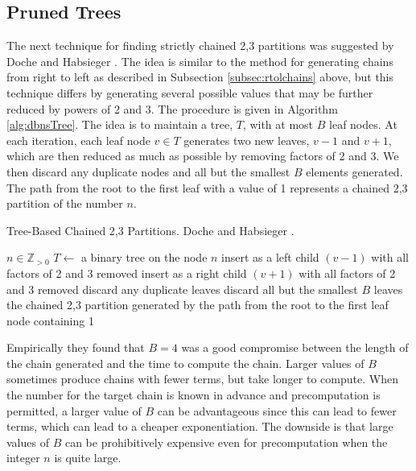 \documentclass{ucalgthes1}
\theoremstyle{plain}
\theoremstyle{definition}
\newcommand{\ZZgtz}{\mathbb{Z}_{>0}}
\begin{document}
\bigbreak
\subsection{Pruned Trees}

The next technique for finding strictly chained 2,3 partitions was suggested by Doche and Habsieger \cite{Doche2008}. The idea is similar to the method for generating chains from right to left as described in Subsection \ref{subsec:rtolchains} above, but this technique differs by generating several possible values that may be further reduced by powers of 2 and 3. The procedure is given in Algorithm \ref{alg:dbnsTree}.  The idea is to maintain a tree, $T$, with at most $B$ leaf nodes. At each iteration, each leaf node $v \in T$ generates two new leaves, $v-1$ and $v+1$, which are then reduced as much as possible by removing factors of 2 and 3.  We then discard any duplicate nodes and all but the smallest $B$ elements generated. The path from the root to the first leaf with a value of 1 represents a chained 2,3 partition of the number $n$.

\begin{algorithm}[h]
\caption{Tree-Based Chained 2,3 Partitions. Doche and Habsieger \cite{Doche2008}.}
\label{alg:dbnsTree}
\begin{algorithmic}[1]
\REQUIRE $n \in \ZZgtz$
\STATE $T \gets$ a binary tree on the node $n$
		\STATE insert as a left child $(v - 1)$ with all factors of 2 and 3 removed
		\STATE insert as a right child $(v + 1)$ with all factors of 2 and 3 removed
	\ENDFOR
	\STATE discard any duplicate leaves
	\STATE discard all but the smallest $B$ leaves
\ENDWHILE
\RETURN the chained 2,3 partition generated by the path from the root to the first leaf node containing 1
\end{algorithmic}
\end{algorithm}

Empirically they found that $B=4$ was a good compromise between the length of the chain generated and the time to compute the chain. Larger values of $B$ sometimes produce chains with fewer terms, but take longer to compute. When the number for the target chain is known in advance and precomputation is permitted, a larger value of $B$ can be advantageous since this can lead to fewer terms, which can lead to a cheaper exponentiation.  The downside is that large values of $B$ can be prohibitively expensive even for precomputation when the integer $n$ is quite large.
\end{document}
